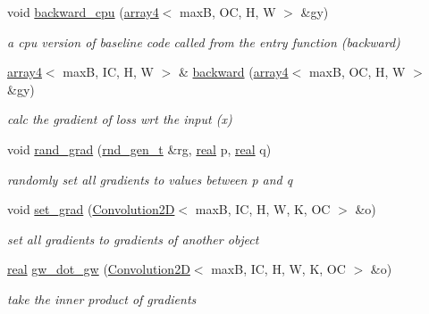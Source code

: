 \begin{DoxyCompactItemize}
void \hyperlink{structConvolution2D_a8b9838267f044544073f95a278304f06}{backward\+\_\+cpu} (\hyperlink{structarray4}{array4}$<$ maxB, OC, H, W $>$ \&gy)
\begin{DoxyCompactList}\small\item\em a cpu version of baseline code called from the entry function (backward) \end{DoxyCompactList}\item 
\hyperlink{structarray4}{array4}$<$ maxB, IC, H, W $>$ \& \hyperlink{structConvolution2D_ace928f0589a42b6505f5787652ffbacd}{backward} (\hyperlink{structarray4}{array4}$<$ maxB, OC, H, W $>$ \&gy)
\begin{DoxyCompactList}\small\item\em calc the gradient of loss wrt the input (x) \end{DoxyCompactList}\item 
void \hyperlink{structConvolution2D_ac66223a9688f45e3422bbdd24c891f70}{rand\+\_\+grad} (\hyperlink{structrnd__gen__t}{rnd\+\_\+gen\+\_\+t} \&rg, \hyperlink{vgg__util_8h_a1082d08aaa761215ec83e7149f27ad16}{real} p, \hyperlink{vgg__util_8h_a1082d08aaa761215ec83e7149f27ad16}{real} q)
\begin{DoxyCompactList}\small\item\em randomly set all gradients to values between p and q \end{DoxyCompactList}\item 
void \hyperlink{structConvolution2D_a8b1f4363ec5f6d3d69890599a0e426da}{set\+\_\+grad} (\hyperlink{structConvolution2D}{Convolution2D}$<$ maxB, IC, H, W, K, OC $>$ \&o)
\begin{DoxyCompactList}\small\item\em set all gradients to gradients of another object \end{DoxyCompactList}\item 
\hyperlink{vgg__util_8h_a1082d08aaa761215ec83e7149f27ad16}{real} \hyperlink{structConvolution2D_a41442b7f48f34045660dbcd64301d14b}{gw\+\_\+dot\+\_\+gw} (\hyperlink{structConvolution2D}{Convolution2D}$<$ maxB, IC, H, W, K, OC $>$ \&o)
\begin{DoxyCompactList}\small\item\em take the inner product of gradients \end{DoxyCompactList}\end{DoxyCompactItemize}
